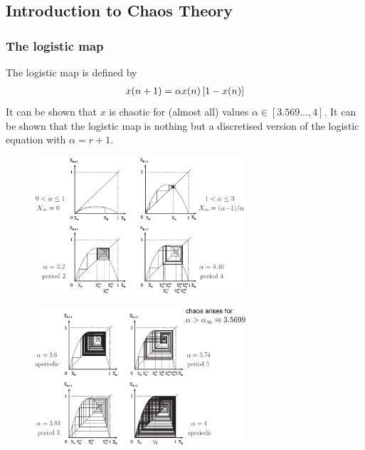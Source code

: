 \subsection{Introduction to Chaos Theory}

\subsubsection{The logistic map}

The logistic map is defined by
\begin{align*}
    x(n+1) = \alpha x(n) \left[ 1 - x(n) \right]
\end{align*}
It can be shown that $x$ is chaotic for (almost all) values
$\alpha \in [3.569\dots,4]$.
It can be shown that the logistic map is nothing but a discretised version
of the logistic equation with $\alpha = r+1$.

\begin{figure}[H]
    \centering
    \includegraphics[width=0.7\textwidth]{Pictures/chaos_theory_intuition.png}
\end{figure}

\begin{figure}[H]
    \centering
    \includegraphics[width=0.7\textwidth]{Pictures/chaos_theory_intuition_2.png}
\end{figure}

